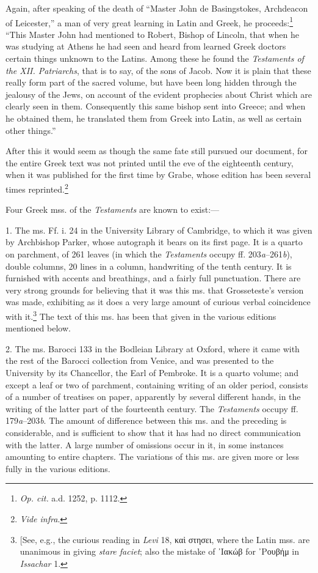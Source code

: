 Again, after speaking of the death of “Master John de Basingstokes, Archdeacon of Leicester,” a man of very great learning in Latin and Greek, he proceeds:\footnote{\emph{Op. cit.} a.d. 1252, p. 1112.} “This Master John had mentioned to Robert, Bishop of Lincoln, that when he was studying at Athens he had seen and heard from learned Greek doctors certain things unknown to the Latins. Among these he found the \emph{Testaments of the XII. Patriarchs}, that is to say, of the sons of Jacob. Now it is plain that these really form part of the sacred volume, but have been long hidden through the jealousy of the Jews, on account of the evident prophecies about Christ which are clearly seen in them. Consequently this same bishop sent into Greece; and when he obtained them, he translated them from Greek into Latin, as well as certain other things.”

After this it would seem as though the same fate still pursued our document, for the entire Greek text was not printed until the eve of the eighteenth century, when it was published for the first time by Grabe, whose edition has been several times reprinted.\footnote{\emph{Vide infra}.}

Four Greek mss. of the \emph{Testaments} are known to exist:—

1. The ms. Ff. i. 24 in the University Library of Cambridge, to which it was given by Archbishop Parker, whose autograph it bears on its first page. It is a quarto on parchment, of 261 leaves (in which the \emph{Testaments} occupy ff. 203\emph{a}–261\emph{b}), double columns, 20 lines in a column, handwriting of the tenth century. It is furnished with accents and breathings, and a fairly full punctuation. There are very strong grounds for believing that it was this ms. that Grosseteste’s version was made, exhibiting as it does a very large amount of curious verbal coincidence with it.\footnote{[See, e.g., the curious reading in \emph{Levi} 18, \textgreek{καὶ στησει}, where the Latin mss. are unanimous in giving \emph{stare faciet}; also the mistake of \textgreek{᾽Ιακώβ} for \textgreek{᾽Ρουβήμ} in \emph{Issachar} 1.} The text of this ms. has been that given in the various editions mentioned below.

2. The ms. Barocci 133 in the Bodleian Library at Oxford, where it came with the rest of the Barocci collection from Venice, and was presented to the University by its Chancellor, the Earl of Pembroke. It is a quarto volume; and except a leaf or two of parchment, containing writing of an older period, consists of a number of treatises on paper, apparently by several different hands, in the writing of the latter part of the fourteenth century. The \emph{Testaments} occupy ff. 179\emph{a}–203\emph{b}. The amount of difference between this ms. and the preceding is considerable, and is sufficient to show that it has had no direct communication with the latter. A large number of omissions occur in it, in some instances amounting to entire chapters. The variations of this ms. are given more or less fully in the various editions.

